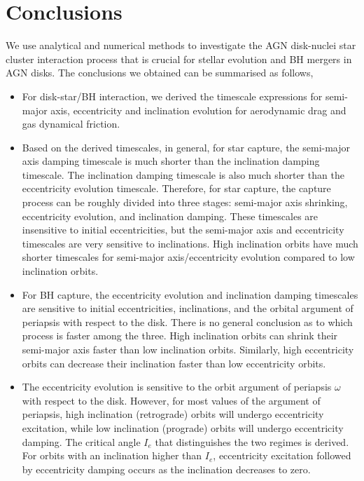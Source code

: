 \documentclass[fleqn,usenatbib]{mnras}
\begin{document}
\section{Conclusions}
We use analytical and numerical methods to investigate the AGN disk-nuclei star cluster interaction process that is crucial for stellar evolution and BH mergers in AGN disks. The conclusions we obtained can be summarised as follows,
\begin{itemize}
    \item For disk-star/BH interaction, we derived the timescale expressions for semi-major axis, eccentricity and inclination evolution for aerodynamic drag and gas dynamical friction. 

    \item Based on the derived timescales, in general, for star capture, the semi-major axis damping timescale is much shorter than the inclination damping timescale. The inclination damping timescale is also much shorter than the eccentricity evolution timescale. Therefore, for star capture, the capture process can be roughly divided into three stages: semi-major axis shrinking, eccentricity evolution, and inclination damping. These timescales are insensitive to initial eccentricities, but the semi-major axis and eccentricity timescales are very sensitive to inclinations. High inclination orbits have much shorter timescales for semi-major axis/eccentricity evolution compared to low inclination orbits.

     \item For BH capture, the eccentricity evolution and inclination damping timescales are sensitive to initial eccentricities, inclinations, and the orbital argument of periapsis with respect to the disk. There is no general conclusion as to which process is faster among the three. High inclination orbits can shrink their semi-major axis faster than low inclination orbits. Similarly, high eccentricity orbits can decrease their inclination faster than low eccentricity orbits.

     \item The eccentricity evolution is sensitive to the orbit argument of periapsis $\omega$ with respect to the disk. However, for most values of the argument of periapsis, high inclination (retrograde) orbits will undergo eccentricity excitation, while low inclination (prograde) orbits will undergo eccentricity damping. The critical angle $I_e$ that distinguishes the two regimes is derived. For orbits with an inclination higher than $I_e$, eccentricity excitation followed by eccentricity damping occurs as the inclination decreases to zero.


\end{itemize}
\end{document}
